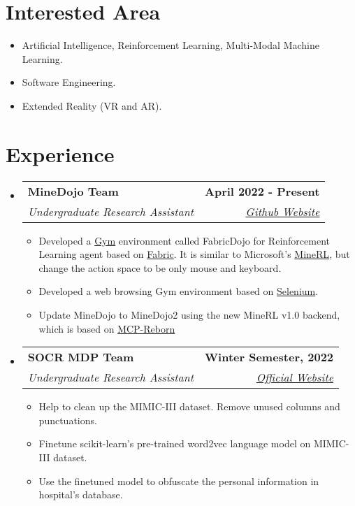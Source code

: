 \documentclass[letterpaper,11pt]{article}
\makeatletter
\newcommand{\resumeItem}[1]{
  \item\small{
    {#1 \vspace{-2pt}}
  }
}
\newcommand{\resumeSubheading}[4]{
  \vspace{-2pt}\item
    \begin{tabular*}{1.0\textwidth}[t]{l@{\extracolsep{\fill}}r}
      \textbf{#1} & \textbf{\small #2} \\
      \textit{\small#3} & \textit{\small #4} \\
    \end{tabular*}\vspace{-7pt}
}
\newcommand{\resumeSubHeadingListStart}{\begin{itemize}[leftmargin=0.0in, label={}]}
\newcommand{\resumeSubHeadingListEnd}{\end{itemize}}
\newcommand{\resumeItemListStart}{\begin{itemize}}
\newcommand{\resumeItemListEnd}{\end{itemize}\vspace{-5pt}}
\makeatother
\begin{document}
\section{Interested Area}
\begin{itemize}[itemsep=-3pt, parsep=3pt]
    \item Artificial Intelligence, Reinforcement Learning, Multi-Modal Machine Learning.
    \item Software Engineering.
    \item Extended Reality (VR and AR).
\end{itemize}

\section{Experience}
 \resumeSubHeadingListStart

   \resumeSubheading
     {MineDojo Team}{April 2022 - Present}
     {Undergraduate Research Assistant}{\href{https://github.com/MineDojo}{Github Website}}
     \resumeItemListStart
       \resumeItem{Developed a \href{https://github.com/openai/gym}{Gym} environment called FabricDojo for Reinforcement Learning agent based on \href{https://fabricmc.net/}{Fabric}. It is similar to Microsoft's \href{https://github.com/minerllabs/minerl}{MineRL}, but change the action space to be only mouse and keyboard.}
       \resumeItem{Developed a web browsing Gym environment based on \href{https://www.selenium.dev/}{Selenium}.}
       \resumeItem{Update MineDojo to MineDojo2 using the new MineRL v1.0 backend, which is based on \href{https://github.com/Hexeption/MCP-Reborn}{MCP-Reborn}}
     \resumeItemListEnd

   \resumeSubheading
   {SOCR MDP Team}{Winter Semester, 2022}
     {Undergraduate Research Assistant}{\href{https://www.socr.umich.edu/}{Official Website}}
     \resumeItemListStart
       \resumeItem{Help to clean up the MIMIC-III dataset. Remove unused columns and punctuations. }
       \resumeItem{Finetune scikit-learn's pre-trained word2vec language model on MIMIC-III dataset.}
       \resumeItem{Use the finetuned model to obfuscate the personal information in hospital's database.}
   \resumeItemListEnd
   
 \resumeSubHeadingListEnd
\vspace{-16pt}
%
\end{document}

